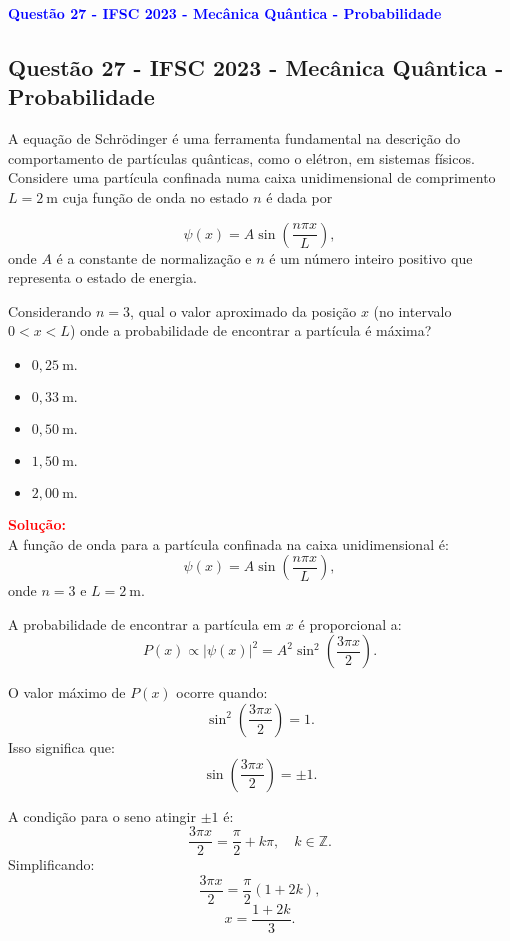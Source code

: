 \begin{flushleft}
\textbf{\textcolor{blue}{\Large Questão 27 - IFSC 2023 - Mecânica Quântica - Probabilidade}}\\
\noindent

\subsection{Questão 27 - IFSC 2023 - Mecânica Quântica - Probabilidade}

A equa\c{c}\~ao de Schr\"odinger \'e uma ferramenta fundamental na descri\c{c}\~ao do comportamento de part\'iculas qu\^anticas, 
como o el\'etron, em sistemas f\'isicos. Considere uma part\'icula confinada numa caixa unidimensional de comprimento $L=2\ \text{m}$ 
cuja fun\c{c}\~ao de onda no estado $n$ \'e dada por

\[
\psi(x)=A\sin\!\left(\frac{n\pi x}{L}\right),
\]
onde $A$ \'e a constante de normaliza\c{c}\~ao e $n$ \'e um n\'umero inteiro positivo que representa o estado de energia.

Considerando $n=3$, qual o valor aproximado da posi\c{c}\~ao $x$ (no intervalo $0<x<L$) onde a probabilidade de encontrar a part\'icula \'e m\'axima?

\begin{itemize}
\item[(A)] $0{,}25\ \text{m}.$
\item[(B)] $0{,}33\ \text{m}.$
\item[(C)] $0{,}50\ \text{m}.$
\item[(D)] $1{,}50\ \text{m}.$
\item[(E)] $2{,}00\ \text{m}.$
\end{itemize}

\vspace{0.5cm}

\textcolor{red}{\textbf{Solu\c{c}\~ao:}}\\

A função de onda para a partícula confinada na caixa unidimensional é:
\[
\psi(x) = A \sin\left(\frac{n\pi x}{L}\right),
\]
onde $n=3$ e $L = 2 \ \text{m}$.

A probabilidade de encontrar a partícula em $x$ é proporcional a:
\[
P(x) \propto |\psi(x)|^2 = A^2 \sin^2\left(\frac{3\pi x}{2}\right).
\]

O valor máximo de $P(x)$ ocorre quando:
\[
\sin^2\left(\frac{3\pi x}{2}\right) = 1.
\]
Isso significa que:
\[
\sin\left(\frac{3\pi x}{2}\right) = \pm 1.
\]

A condição para o seno atingir $\pm 1$ é:
\[
\frac{3\pi x}{2} = \frac{\pi}{2} + k\pi, \quad k \in \mathbb{Z}.
\]
Simplificando:
\[
\frac{3\pi x}{2} = \frac{\pi}{2}(1 + 2k),
\]
\[
x = \frac{1 + 2k}{3}.
\]


\end{flushleft}
